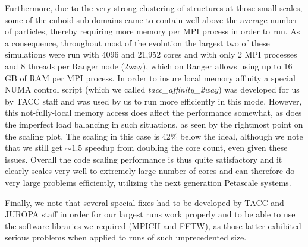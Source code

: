 Furthermore, due to the very strong clustering of structures at those small 
scales, some of the cuboid sub-domains came to contain well above the 
average number of particles, thereby requiring more memory per MPI process
in order to run. As a consequence, throughout most of the evolution the 
largest two of these simulations were run with 4096 and 21,952 cores and 
with only 2 MPI processes and 8 threads per Ranger node (2way), which on 
Ranger allows using up to 16 GB of RAM per MPI process. In order to insure 
local memory affinity a special NUMA control script (which we called {\it 
tacc\_affinity\_2way}) 
was developed for us by TACC staff and was used by us to run more efficiently 
in this mode. However, this not-fully-local memory access does affect the 
performance somewhat, as does the imperfect load balancing in such situations,
as seen by the rightmost point on the scaling plot. The scaling in this case
is 42\% below the ideal, although we note that we still get $\sim1.5$ speedup
from doubling the core count, even given these issues. Overall the
code scaling performance is thus quite satisfactory and it clearly 
scales very well to extremely large number of cores and can therefore 
do very large problems efficiently, utilizing the next generation 
Petascale systems. 

Finally, we note that several special fixes had to be developed by TACC 
and JUROPA staff in order for our largest runs work properly and to be 
able to use the software libraries we required (MPICH and FFTW), as those 
latter exhibited serious problems when applied to runs of such 
unprecedented size. 
